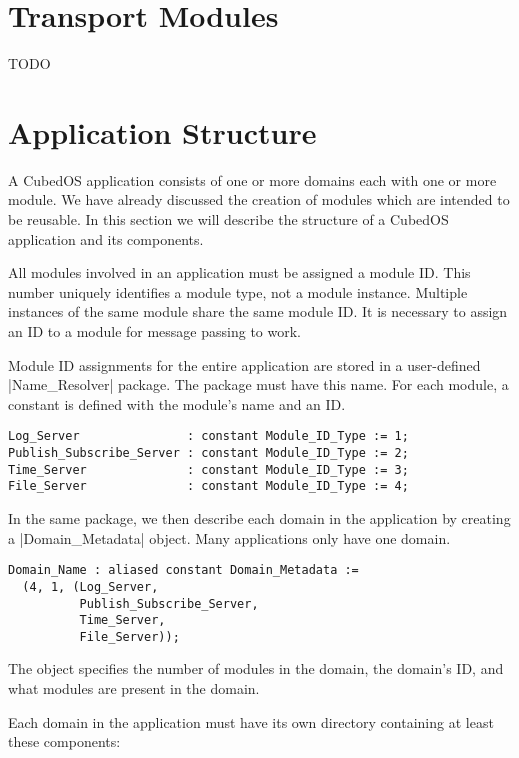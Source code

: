\section{Transport Modules}

TODO

\section{Application Structure}

A CubedOS application consists of one or more domains each with one or more module. We have
already discussed the creation of modules which are intended to be reusable. In this section we
will describe the structure of a CubedOS application and its components.

All modules involved in an application must be assigned a module ID. This number uniquely
identifies a module type, not a module instance. Multiple instances of the same module share the
same module ID. It is necessary to assign an ID to a module for message passing to work.

Module ID assignments for the entire application are stored in a user-defined |Name_Resolver|
package. The package must have this name. For each module, a constant is defined with the
module's name and an ID.

\begin{verbatim}
Log_Server               : constant Module_ID_Type := 1;
Publish_Subscribe_Server : constant Module_ID_Type := 2;
Time_Server              : constant Module_ID_Type := 3;
File_Server              : constant Module_ID_Type := 4;
\end{verbatim}

In the same package, we then describe each domain in the application by creating a
|Domain_Metadata| object. Many applications only have one domain.

\begin{verbatim}
Domain_Name : aliased constant Domain_Metadata :=
  (4, 1, (Log_Server,
          Publish_Subscribe_Server,
          Time_Server,
          File_Server));
\end{verbatim}

The object specifies the number of modules in the domain, the domain's ID, and what modules are
present in the domain.

Each domain in the application must have its own directory containing at least these components:

